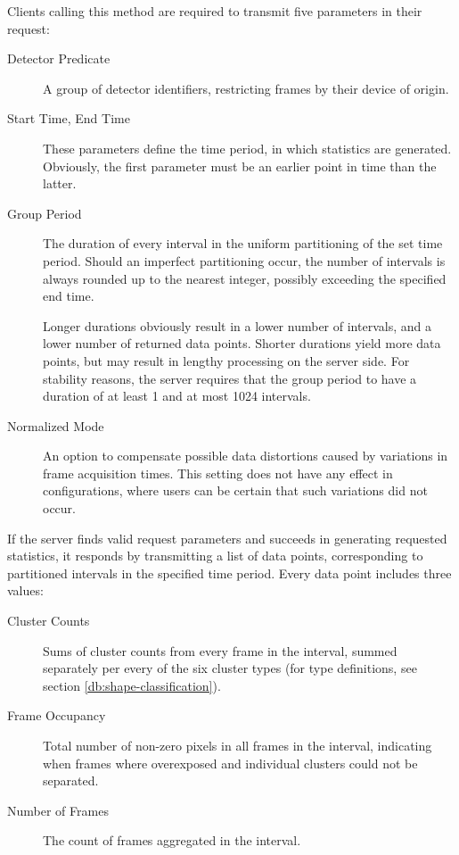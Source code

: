 Clients calling this method are required to transmit five parameters in their request:

\begin{description}
	\item[Detector Predicate]
	A group of detector identifiers, restricting frames by their device of origin.

	\item[Start Time, End Time]
	These parameters define the time period, in which statistics are generated. Obviously, the first parameter must be an earlier point in time than the latter.

	\item[Group Period]
	The duration of every interval in the uniform partitioning of the set time period. Should an imperfect partitioning occur, the number of intervals is always rounded up to the nearest integer, possibly exceeding the specified end time.

	Longer durations obviously result in a lower number of intervals, and a lower number of returned data points. Shorter durations yield more data points, but may result in lengthy processing on the server side. For stability reasons, the server requires that the group period to have a duration of at least 1 and at most 1024 intervals.

	\item[Normalized Mode]
	An option to compensate possible data distortions caused by variations in frame acquisition times. This setting does not have any effect in configurations, where users can be certain that such variations did not occur.
\end{description}

If the server finds valid request parameters and succeeds in generating requested statistics, it responds by transmitting a list of data points, corresponding to partitioned intervals in the specified time period. Every data point includes three values:

\begin{description}
	\item[Cluster Counts]
	Sums of cluster counts from every frame in the interval, summed separately per every of the six cluster types (for type definitions, see section \ref{db:shape-classification}).

	\item[Frame Occupancy]
	Total number of non-zero pixels in all frames in the interval, indicating when frames where overexposed and individual clusters could not be separated.

	\item[Number of Frames]
	The count of frames aggregated in the interval.
\end{description}

